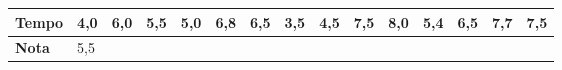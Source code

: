 \documentclass[12pt,brazil,]{book}
\begin{document}
\begin{longtable}[]{@{}lllllllllllllll@{}}
\begin{minipage}[b]{0.10\columnwidth}
\textbf{Tempo}\strut
\end{minipage} & \begin{minipage}[b]{0.04\columnwidth}\raggedright
4,0\strut
\end{minipage} & \begin{minipage}[b]{0.04\columnwidth}\raggedright
6,0\strut
\end{minipage} & \begin{minipage}[b]{0.04\columnwidth}\raggedright
5,5\strut
\end{minipage} & \begin{minipage}[b]{0.04\columnwidth}\raggedright
5,0\strut
\end{minipage} & \begin{minipage}[b]{0.04\columnwidth}\raggedright
6,8\strut
\end{minipage} & \begin{minipage}[b]{0.04\columnwidth}\raggedright
6,5\strut
\end{minipage} & \begin{minipage}[b]{0.04\columnwidth}\raggedright
3,5\strut
\end{minipage} & \begin{minipage}[b]{0.04\columnwidth}\raggedright
4,5\strut
\end{minipage} & \begin{minipage}[b]{0.04\columnwidth}\raggedright
7,5\strut
\end{minipage} & \begin{minipage}[b]{0.04\columnwidth}\raggedright
8,0\strut
\end{minipage} & \begin{minipage}[b]{0.04\columnwidth}\raggedright
5,4\strut
\end{minipage} & \begin{minipage}[b]{0.04\columnwidth}\raggedright
6,5\strut
\end{minipage} & \begin{minipage}[b]{0.04\columnwidth}\raggedright
7,7\strut
\end{minipage} & \begin{minipage}[b]{0.04\columnwidth}\raggedright
7,5\strut
\end{minipage}\tabularnewline
\midrule
\endhead
\begin{minipage}[t]{0.10\columnwidth}\raggedright
\textbf{Nota}\strut
\end{minipage} & \begin{minipage}[t]{0.04\columnwidth}\raggedright
5,5\strut
\end{minipage} & \begin{minipage}[t]{0.04\columnwidth}\raggedright

\end{minipage}
\end{longtable}
\end{document}
